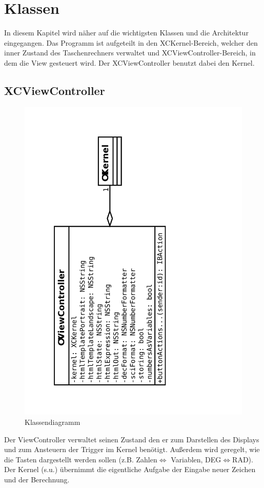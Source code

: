 \chapter{Klassen}
In diesem Kapitel wird näher auf die wichtigsten Klassen und die Architektur eingegangen.
Das Programm ist aufgeteilt in den XCKernel-Bereich, welcher den inner Zustand des Taschenrechners verwaltet
und XCViewController-Bereich, in dem die View gesteuert wird. Der XCViewController benutzt dabei den Kernel.
\section{XCViewController}
\begin{figure}[H]
	\centering
	\label{dia:sq:eval}
	\includegraphics[angle=270, width=1\textwidth]{cl_vc.pdf}
	\caption{Klassendiagramm}
\end{figure}
Der ViewController verwaltet seinen Zustand den er zum Darstellen des Displays und zum Ansteuern der Trigger im Kernel benötigt.
Außerdem wird geregelt, wie die Tasten dargestellt werden sollen (z.B. Zahlen$\iff$ Variablen, DEG$\iff$RAD). Der Kernel (s.u.) übernimmt die eigentliche Aufgabe der Eingabe neuer Zeichen und der Berechnung.


